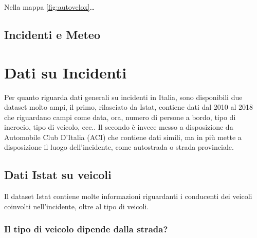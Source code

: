 \documentclass[a4paper]{report}
\begin{document}
Nella mappa \ref{fig:autovelox}\dots



\section{Incidenti e Meteo}

\chapter{Dati su Incidenti}

Per quanto riguarda dati generali su incidenti in Italia, sono disponibili due dataset molto ampi, 
il primo, rilasciato da Istat, contiene dati dal 2010 al 2018 che riguardano campi come data, ora, 
numero di persone a bordo, tipo di incrocio, tipo di veicolo, ecc..
Il secondo è invece messo a disposizione da Automobile Club D'Italia (ACI) che contiene dati simili, 
ma in più mette a disposizione il luogo dell'incidente, come autostrada o strada provinciale.

\section{Dati Istat su veicoli}

Il dataset Istat contiene molte informazioni riguardanti i conducenti dei veicoli coinvolti 
nell'incidente, oltre al tipo di veicoli.

\subsection{Il tipo di veicolo dipende dalla strada?}
\end{document}
